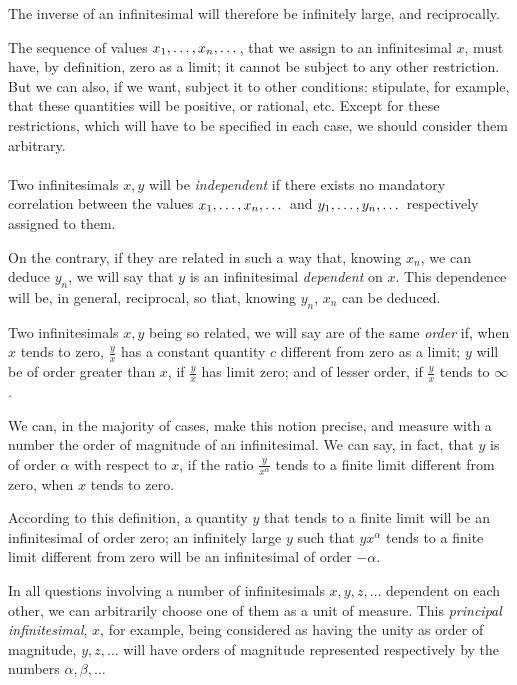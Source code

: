 \documentclass[10pt,letterpaper]{book}
\theoremstyle{definition}
\begin{document}
The inverse of an infinitesimal will therefore be infinitely large, and reciprocally.

The sequence of values ${x_1}, \dots, {x_n}, \dots$, that we assign to an infinitesimal $x$, must have, by definition, zero as a limit; it cannot be subject to any other restriction. But we can also, if we want, subject it to other conditions: stipulate, for example, that these quantities will be positive, or rational, etc. Except for these restrictions, which will have to be specified in each case, we should consider them arbitrary.

\paragraph{} Two infinitesimals $x, y$ will be \textit{independent} if there exists no mandatory correlation between the values ${x_1}, \dots, {x_n}, \dots$ and ${y_1}, \dots, {y_n}, \dots$ respectively assigned to them.

On the contrary, if they are related in such a way that, knowing $x_n$, we can deduce $y_n$, we will say that $y$ is an infinitesimal \textit{dependent} on $x$. This dependence will be, in general, reciprocal, so that, knowing $y_n$, $x_n$ can be deduced.

Two infinitesimals $x, y$ being so related, we will say are of the same \textit{order} if, when $x$ tends to zero, $\frac y x$ has a constant quantity $c$ different from zero as a limit; $y$ will be of order greater than $x$, if $\frac y x$ has limit zero; and of lesser order, if $\frac y x$ tends to $\infty$.

We can, in the majority of cases, make this notion precise, and measure with a number the order of magnitude of an infinitesimal. We can say, in fact, that $y$ is of order $\alpha$ with respect to $x$, if the ratio $\frac{y}{x^\alpha}$ tends to a finite limit different from zero, when $x$ tends to zero.


According to this definition, a quantity $y$ that tends to a finite limit will be an infinitesimal of order zero; an infinitely large $y$ such that $yx^\alpha$ tends to a finite limit different from zero will be an infinitesimal of order $-\alpha$.

In all questions involving a number of infinitesimals $x,y,z,\dots$ dependent on each other, we can arbitrarily choose one of them as a unit of measure. This \textit{principal infinitesimal}, $x$, for example, being considered as having the unity as order of magnitude, $y, z, \dots$ will have orders of magnitude represented respectively by the numbers $\alpha, \beta, \dots$
\end{document}
